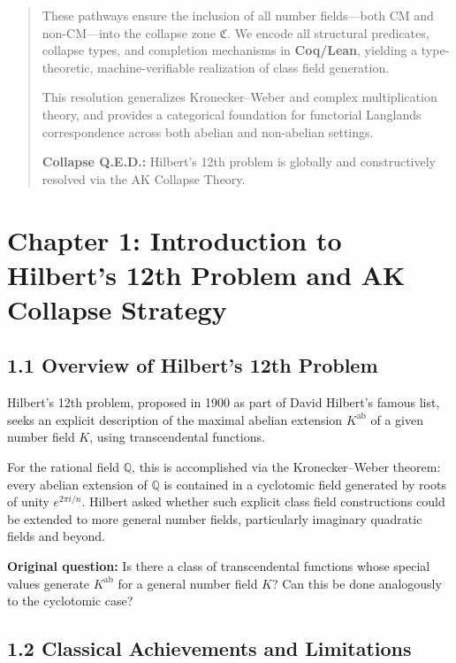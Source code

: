 \documentclass[11pt]{article}
\begin{document}
\begin{abstract}
These pathways ensure the inclusion of all number fields—both CM and non-CM—into the collapse zone \( \mathfrak{C} \). We encode all structural predicates, collapse types, and completion mechanisms in \textbf{Coq/Lean}, yielding a type-theoretic, machine-verifiable realization of class field generation.

This resolution generalizes Kronecker–Weber and complex multiplication theory, and provides a categorical foundation for functorial Langlands correspondence across both abelian and non-abelian settings.

\textbf{Collapse Q.E.D.:} Hilbert’s 12th problem is globally and constructively resolved via the AK Collapse Theory.
\end{abstract}




\section{Chapter 1: Introduction to Hilbert's 12th Problem and AK Collapse Strategy}

\subsection{1.1 Overview of Hilbert's 12th Problem}

Hilbert's 12th problem, proposed in 1900 as part of David Hilbert's famous list, seeks an explicit description of the maximal abelian extension \( K^{\mathrm{ab}} \) of a given number field \( K \), using transcendental functions.

For the rational field \( \mathbb{Q} \), this is accomplished via the Kronecker–Weber theorem: every abelian extension of \( \mathbb{Q} \) is contained in a cyclotomic field generated by roots of unity \( e^{2\pi i/n} \).  
Hilbert asked whether such explicit class field constructions could be extended to more general number fields, particularly imaginary quadratic fields and beyond.

\textbf{Original question:}  
Is there a class of transcendental functions whose special values generate \( K^{\mathrm{ab}} \) for a general number field \( K \)?  
Can this be done analogously to the cyclotomic case?

\subsection{1.2 Classical Achievements and Limitations}
\end{document}
